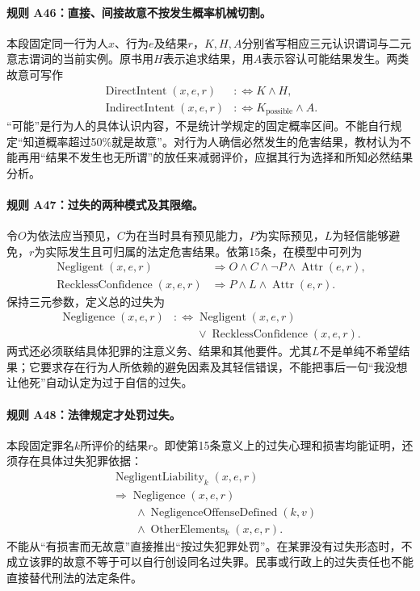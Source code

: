 \paragraph{规则 A46：直接、间接故意不按发生概率机械切割。}
本段固定同一行为人$x$、行为$e$及结果$r$，$K,H,A$分别省写相应三元认识谓词与二元意志谓词的当前实例。原书用$H$表示追求结果，用$A$表示容认可能结果发生。两类故意可写作
\[
\begin{aligned}
\operatorname{DirectIntent}(x,e,r)&:\!\iff K\land H,\\
\operatorname{IndirectIntent}(x,e,r)&:\!\iff K_{\mathrm{possible}}\land A.
\end{aligned}
\]
“可能”是行为人的具体认识内容，不是统计学规定的固定概率区间。不能自行规定“知道概率超过50\%就是故意”。对行为人确信必然发生的危害结果，教材认为不能再用“结果不发生也无所谓”的放任来减弱评价，应据其行为选择和所知必然结果分析。

\paragraph{规则 A47：过失的两种模式及其限缩。}
令$O$为依法应当预见，$C$为在当时具有预见能力，$P$为实际预见，$L$为轻信能够避免，$r$为实际发生且可归属的法定危害结果。依第15条，在模型中可列为
\[
\begin{aligned}
\operatorname{Negligent}(x,e,r)
&\Longrightarrow O\land C\land\neg P\land\operatorname{Attr}(e,r),\\
\operatorname{RecklessConfidence}(x,e,r)
&\Longrightarrow P\land L\land\operatorname{Attr}(e,r).
\end{aligned}
\]
保持三元参数，定义总的过失为
\[
\begin{aligned}
\operatorname{Negligence}(x,e,r)
&:\!\iff\operatorname{Negligent}(x,e,r)\\
&\qquad\lor\operatorname{RecklessConfidence}(x,e,r).
\end{aligned}
\]
两式还必须联结具体犯罪的注意义务、结果和其他要件。尤其$L$不是单纯不希望结果；它要求存在行为人所依赖的避免因素及其轻信错误，不能把事后一句“我没想让他死”自动认定为过于自信的过失。

\paragraph{规则 A48：法律规定才处罚过失。}
本段固定罪名$k$所评价的结果$r$。即使第15条意义上的过失心理和损害均能证明，还须存在具体过失犯罪依据：
\[
\begin{aligned}
&\operatorname{NegligentLiability}_k(x,e,r)\\
&\Longrightarrow\operatorname{Negligence}(x,e,r)\\
&\qquad\land\operatorname{NegligenceOffenseDefined}(k,v)\\
&\qquad\land\operatorname{OtherElements}_k(x,e,r).
\end{aligned}
\]
不能从“有损害而无故意”直接推出“按过失犯罪处罚”。在某罪没有过失形态时，不成立该罪的故意不等于可以自行创设同名过失罪。民事或行政上的过失责任也不能直接替代刑法的法定条件。


